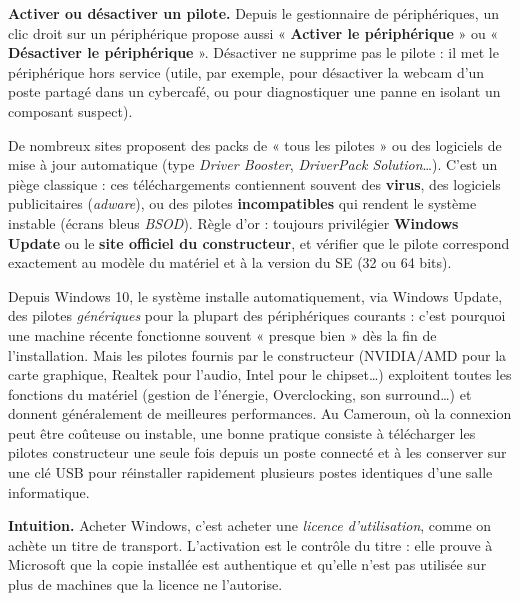 \documentclass[11pt]{article}
\newcommand{\cle}[1]{{\popxbold\color{popdark}#1}}
\newcounter{popsec}
\newcounter{popsub}
\newcommand{\courssub}[1]{%
  \stepcounter{popsub}%
  \par\vspace{9pt}\noindent{\popxbold\fontsize{11.5}{13}\selectfont\color{popink}{\color{poporange}\thepopsec.\thepopsub}\hspace{6pt}#1}\par\nopagebreak\vspace{4pt}
}
\begin{document}
\textbf{Activer ou désactiver un pilote.} Depuis le gestionnaire de périphériques, un clic droit sur un périphérique propose aussi « \textbf{Activer le périphérique} » ou « \textbf{Désactiver le périphérique} ». Désactiver ne supprime pas le pilote : il met le périphérique hors service (utile, par exemple, pour désactiver la webcam d'un poste partagé dans un cybercafé, ou pour diagnostiquer une panne en isolant un composant suspect).

\begin{attention}
De nombreux sites proposent des packs de « tous les pilotes » ou des logiciels de mise à jour automatique (type \emph{Driver Booster}, \emph{DriverPack Solution}\ldots). C'est un piège classique : ces téléchargements contiennent souvent des \textbf{virus}, des logiciels publicitaires (\emph{adware}), ou des pilotes \textbf{incompatibles} qui rendent le système instable (écrans bleus \emph{BSOD}). Règle d'or : toujours privilégier \textbf{Windows Update} ou le \textbf{site officiel du constructeur}, et vérifier que le pilote correspond exactement au modèle du matériel et à la version du SE (32 ou 64 bits).
\end{attention}

\begin{savaistu}
Depuis Windows 10, le système installe automatiquement, via Windows Update, des pilotes \emph{génériques} pour la plupart des périphériques courants : c'est pourquoi une machine récente fonctionne souvent « presque bien » dès la fin de l'installation. Mais les pilotes fournis par le constructeur (NVIDIA/AMD pour la carte graphique, Realtek pour l'audio, Intel pour le chipset\ldots) exploitent toutes les fonctions du matériel (gestion de l'énergie, Overclocking, son surround\ldots) et donnent généralement de meilleures performances. Au Cameroun, où la connexion peut être coûteuse ou instable, une bonne pratique consiste à télécharger les pilotes constructeur une seule fois depuis un poste connecté et à les conserver sur une clé USB pour réinstaller rapidement plusieurs postes identiques d'une salle informatique.
\end{savaistu}

\courssub{Activation du système d'exploitation}

\textbf{Intuition.} Acheter Windows, c'est acheter une \emph{licence d'utilisation}, comme on achète un titre de transport. L'\cle{activation} est le contrôle du titre : elle prouve à Microsoft que la copie installée est authentique et qu'elle n'est pas utilisée sur plus de machines que la licence ne l'autorise.
\end{document}
